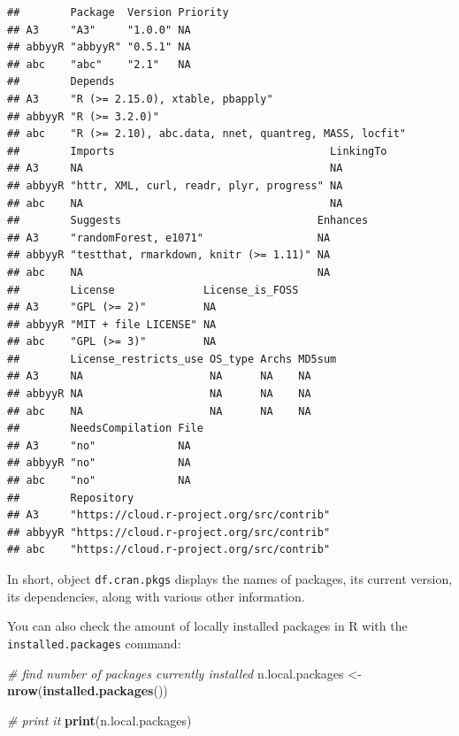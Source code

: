 \documentclass[11pt,]{book}
\newenvironment{Shaded}{\begin{snugshade}}{\end{snugshade}}
\newcommand{\KeywordTok}[1]{\textcolor[rgb]{0.27,0.27,0.27}{\textbf{#1}}}
\newcommand{\StringTok}[1]{\textcolor[rgb]{0.5,0.5,0.5}{#1}}
\newcommand{\CommentTok}[1]{\textcolor[rgb]{0.56,0.35,0.01}{\textit{#1}}}
\newcommand{\NormalTok}[1]{#1}
\begin{document}
\begin{verbatim}
##        Package  Version Priority
## A3     "A3"     "1.0.0" NA      
## abbyyR "abbyyR" "0.5.1" NA      
## abc    "abc"    "2.1"   NA      
##        Depends                                              
## A3     "R (>= 2.15.0), xtable, pbapply"                     
## abbyyR "R (>= 3.2.0)"                                       
## abc    "R (>= 2.10), abc.data, nnet, quantreg, MASS, locfit"
##        Imports                                  LinkingTo
## A3     NA                                       NA       
## abbyyR "httr, XML, curl, readr, plyr, progress" NA       
## abc    NA                                       NA       
##        Suggests                               Enhances
## A3     "randomForest, e1071"                  NA      
## abbyyR "testthat, rmarkdown, knitr (>= 1.11)" NA      
## abc    NA                                     NA      
##        License              License_is_FOSS
## A3     "GPL (>= 2)"         NA             
## abbyyR "MIT + file LICENSE" NA             
## abc    "GPL (>= 3)"         NA             
##        License_restricts_use OS_type Archs MD5sum
## A3     NA                    NA      NA    NA    
## abbyyR NA                    NA      NA    NA    
## abc    NA                    NA      NA    NA    
##        NeedsCompilation File
## A3     "no"             NA  
## abbyyR "no"             NA  
## abc    "no"             NA  
##        Repository                               
## A3     "https://cloud.r-project.org/src/contrib"
## abbyyR "https://cloud.r-project.org/src/contrib"
## abc    "https://cloud.r-project.org/src/contrib"
\end{verbatim}

In short, object \texttt{df.cran.pkgs} displays the names of packages,
its current version, its dependencies, along with various other
information.

You can also check the amount of locally installed packages in R with
the \texttt{installed.packages} command: 

\begin{Shaded}
\begin{Highlighting}[]
\CommentTok{# find number of packages currently installed}
\NormalTok{n.local.packages <-}\StringTok{ }\KeywordTok{nrow}\NormalTok{(}\KeywordTok{installed.packages}\NormalTok{())}

\CommentTok{# print it }
\KeywordTok{print}\NormalTok{(n.local.packages)}
\end{Highlighting}
\end{Shaded}
\end{document}
